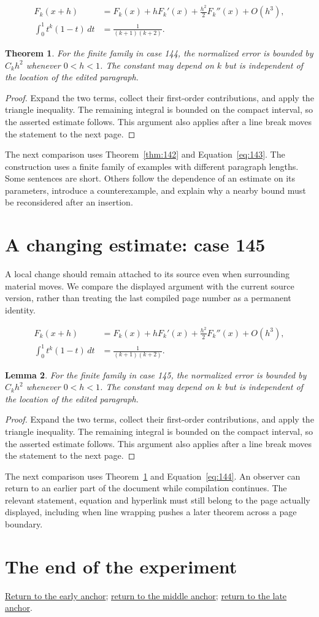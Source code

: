 \documentclass[a4paper,10pt]{article}
\newtheorem{theorem}{Theorem}[section]
\newtheorem{lemma}[theorem]{Lemma}
\begin{document}
\lipsum[10-11]
\begin{align}\label{eq:143}
 F_k(x+h)&=F_k(x)+hF_k'(x)+\frac{h^2}{2}F_k''(x)+O(h^3),\\
 \int_0^1 t^k(1-t)\,dt&=\frac{1}{(k+1)(k+2)}.
\end{align}
\begin{theorem}\label{thm:143}
For the finite family in case 144, the normalized error is bounded by $C_k h^2$ whenever $0<h<1$. The constant may depend on $k$ but is independent of the location of the edited paragraph.
\end{theorem}
\begin{proof}
Expand the two terms, collect their first-order contributions, and apply the
triangle inequality. The remaining integral is bounded on the compact interval,
so the asserted estimate follows. This argument also applies after a line break
moves the statement to the next page.
\end{proof}
The next comparison uses Theorem~\ref{thm:142} and Equation~\ref{eq:143}. The construction uses a finite family of examples with different paragraph lengths. Some sentences are short. Others follow the dependence of an estimate on its parameters, introduce a counterexample, and explain why a nearby bound must be reconsidered after an insertion.

\lipsum[18]

\section{A changing estimate: case 145}\label{unit:144}
A local change should remain attached to its source even when surrounding material moves. We compare the displayed argument with the current source version, rather than treating the last compiled page number as a permanent identity.

\lipsum[13-14]
\begin{align}\label{eq:144}
 F_k(x+h)&=F_k(x)+hF_k'(x)+\frac{h^2}{2}F_k''(x)+O(h^3),\\
 \int_0^1 t^k(1-t)\,dt&=\frac{1}{(k+1)(k+2)}.
\end{align}
\begin{lemma}\label{thm:144}
For the finite family in case 145, the normalized error is bounded by $C_k h^2$ whenever $0<h<1$. The constant may depend on $k$ but is independent of the location of the edited paragraph.
\end{lemma}
\begin{proof}
Expand the two terms, collect their first-order contributions, and apply the
triangle inequality. The remaining integral is bounded on the compact interval,
so the asserted estimate follows. This argument also applies after a line break
moves the statement to the next page.
\end{proof}
The next comparison uses Theorem~\ref{thm:143} and Equation~\ref{eq:144}. An observer can return to an earlier part of the document while compilation continues. The relevant statement, equation and hyperlink must still belong to the page actually displayed, including when line wrapping pushes a later theorem across a page boundary.

\lipsum[23]

\section*{The end of the experiment}
\hyperref[anchor:early]{Return to the early anchor}; \hyperref[anchor:middle]{return to the middle anchor}; \hyperref[anchor:late]{return to the late anchor}.
\end{document}
